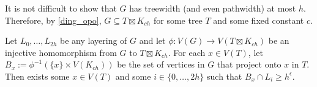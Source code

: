 \documentclass{patmorin}
\begin{document}



It is not difficult to show that $G$ has treewidth (and even pathwidth) at most $h$.  Therefore, by \cref{ding_opo}, $G\subseteq T\boxtimes K_{ch}$ for some tree $T$ and some fixed constant $c$.

\begin{lem}
  Let $L_0,\ldots,L_{2h}$ be any layering of $G$ and let $\phi:V(G)\to V(T\boxtimes K_{ch})$ be an injective homomorphism from $G$ to $T\boxtimes K_{ch}$. For each $x\in V(T)$, let $B_x := \phi^{-1}(\{x\}\times V(K_{ch}))$ be the set of vertices in $G$ that project onto $x$ in $T$.  Then exists some $x\in V(T)$ and some $i\in\{0,\ldots,2h\}$ such that $B_x\cap L_i\ge h^{\epsilon}$.
\end{lem}
\end{document}
